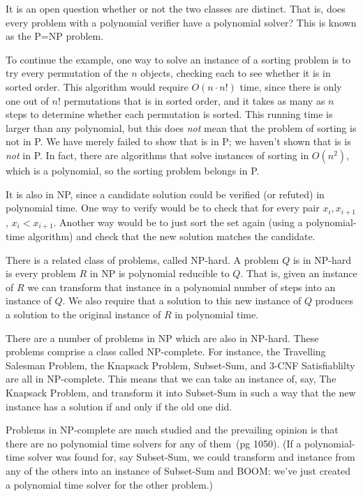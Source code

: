 \documentclass[12pt]{article}
\begin{document}
    It is an open question whether or not the two classes are distinct. That is, does every problem with a polynomial verifier have a polynomial solver? This is known as the P=NP problem.

    To continue the example, one way to solve an instance of a sorting problem is to try every permutation of the $n$ objects, checking each to see whether it is in sorted order. This algorithm would require $O(n\cdot n!)$ time, since there is only one out of $n!$ permutations that is in sorted order, and it takes as many as $n$ steps to determine whether each permutation is sorted. This running time is larger than any polynomial, but this does \emph{not} mean that the problem of sorting is not in P. We have merely failed to show that is in P; we haven't shown that is is \emph{not} in P. In fact, there are algorithms that solve instances of sorting in $O(n^2)$, which is a polynomial, so the sorting problem belongs in P. 

    It is also in NP, since a candidate solution could be verified (or refuted) in polynomial time. One way to verify would be to check that for every pair $x_i, x_{i+1}$, $x_i < x_{i+1}$. Another way would be to just sort the set again (using a polynomial-time algorithm) and check that the new solution matches the candidate. 

    There is a related class of problems, called NP-hard. A problem $Q$ is in NP-hard is every problem $R$ in NP is polynomial reducible to $Q$. That is, given an instance of $R$ we can transform that instance in a polynomial number of steps into an instance of $Q$. We also require that a solution to this new instance of $Q$ produces a solution to the original instance of $R$ in polynomial time.

    There are a number of problems in NP which are also in NP-hard. These problems comprise a class called NP-complete. For instance, the Travelling Salesman Problem, the Knapsack Problem, Subset-Sum, and 3-CNF Satisfiablilty are all in NP-complete. This means that we can take an instance of, say, The Knapsack Problem, and transform it into Subset-Sum in such a way that the new instance has a solution if and only if the old one did. %

    Problems in NP-complete are much studied and the prevailing opinion is that there are no polynomial time solvers for any of them~\cite{clrs}(pg 1050). (If a polynomial-time solver was found for, say Subset-Sum, we could transform and instance from any of the others into an instance of Subset-Sum and BOOM: we've just created a polynomial time solver for the other problem.)
\end{document}
